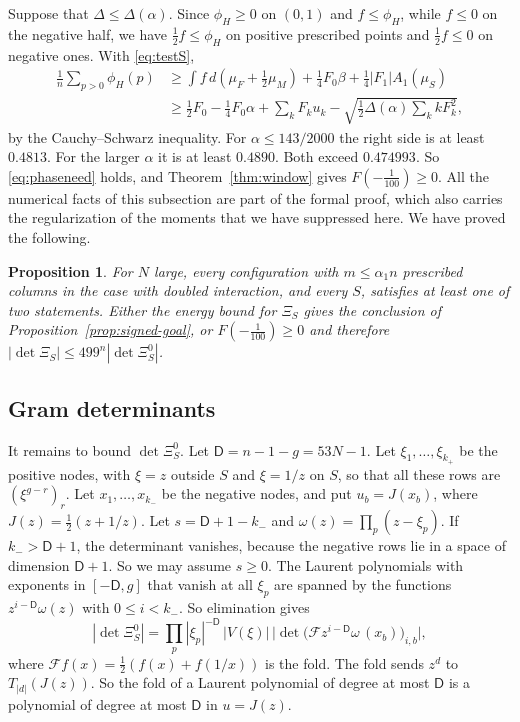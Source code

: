 \documentclass[11pt]{amsart}
\newtheorem{proposition}[theorem]{Proposition}
\theoremstyle{definition}
\theoremstyle{remark}
\numberwithin{equation}{section}
\begin{document}
Suppose that $\Delta\le\Delta(\alpha)$. Since $\phi_H\ge0$ on $(0,1)$ and $f\le\phi_H$, while $f\le0$ on the negative
half, we have $\frac12f\le\phi_H$ on positive prescribed points and $\frac12f\le0$ on negative ones. With
\eqref{eq:testS},
\begin{align*}
 \frac1n\sum_{p>0}\phi_H(p)&\ge\int f\,d(\mu_F+\tfrac12\mu_M)+\tfrac14F_0\beta+\tfrac14|F_1|A_1(\mu_S)\\
 &\ge\tfrac12F_0-\tfrac14F_0\alpha+\sum_kF_ku_k-\sqrt{\tfrac12\Delta(\alpha)\sum_kkF_k^2},
\end{align*}
by the Cauchy--Schwarz inequality. For $\alpha\le143/2000$ the right side is at least $0.4813$. For the larger
$\alpha$ it is at least $0.4890$. Both exceed $0.474993$. So \eqref{eq:phaseneed} holds, and
Theorem~\ref{thm:window} gives $F(-\frac1{100})\ge0$. All the numerical facts of this subsection are part of the formal proof, which also carries the regularization of the moments that we have suppressed here. We have proved the following.

\begin{proposition}\label{prop:alternative}
For $N$ large, every configuration with $m\le\alpha_1n$ prescribed columns in the case with doubled interaction, and
every $S$, satisfies at least one of two statements. Either the energy bound for $\Xi_S$ gives the conclusion
of Proposition~\ref{prop:signed-goal}, or $F(-\frac1{100})\ge0$ and therefore
$|\det\Xi_S|\le499^n|\det\Xi^0_S|$.
\end{proposition}

\subsection{Gram determinants}\label{ssec:gram}
It remains to bound $\det\Xi^0_S$. Let $\mathsf D=n-1-g=53N-1$. Let $\xi_1,\ldots,\xi_{k_+}$ be the positive nodes, with
$\xi=z$ outside $S$ and $\xi=1/z$ on $S$, so that all these rows are $(\xi^{g-r})_r$. Let $x_1,\ldots,x_{k_-}$ be the
negative nodes, and put $u_b=J(x_b)$, where $J(z)=\frac12(z+1/z)$. Let $s=\mathsf D+1-k_-$ and $\omega(z)=\prod_p(z-\xi_p)$. If
$k_->\mathsf D+1$, the determinant vanishes, because the negative rows lie in a space of dimension $\mathsf D+1$. So we may assume
$s\ge0$. The Laurent polynomials with exponents in $[-\mathsf D,g]$ that vanish at all $\xi_p$ are spanned by the functions
$z^{i-\mathsf D}\omega(z)$ with $0\le i<k_-$. So elimination gives
\begin{equation}\label{eq:split}
 |\det\Xi^0_S|=\prod_p|\xi_p|^{-\mathsf D}\,|V(\xi)|\,\bigl|\det\bigl(\mathcal Fz^{i-\mathsf D}\omega\,(x_b)\bigr)_{i,b}\bigr|,
\end{equation}
where $\mathcal Ff(x)=\frac12(f(x)+f(1/x))$ is the fold. The fold sends $z^d$ to $T_{|d|}(J(z))$. So the fold of a Laurent
polynomial of degree at most $\mathsf D$ is a polynomial of degree at most $\mathsf D$ in $u=J(z)$.
\end{document}
